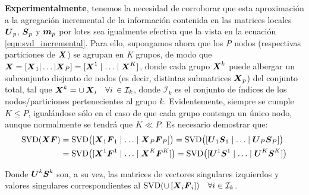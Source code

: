 \documentclass[00-Trabajo_Final.tex]{subfiles}
\begin{document}
\vspace{0.5em}

\textbf{Experimentalmente}, tenemos la necesidad de corroborar que esta aproximación a la agregación incremental de la información contenida en las matrices locales $\boldsymbol{U}_p$, $\boldsymbol{S}_p$ y $\boldsymbol{m}_p$ por lotes sea igualmente efectiva que la vista en la ecuación \eqref{eqn:svd_incremental}. Para ello, supongamos ahora que los \textit{P} nodos (respectivas particiones de $\boldsymbol{X}$) se agrupan en \textit{K} grupos, de modo que $\boldsymbol{X} = [\boldsymbol{X}_1|\ldots|\boldsymbol{X}_P] = [\boldsymbol{X}^{1} \mid \ldots \mid \boldsymbol{X}^{K}]$, donde cada grupo $\boldsymbol{X}^k$ puede albergar un subconjunto disjunto de nodos (es decir, distintas submatrices $\boldsymbol{X}_p$) del conjunto total, tal que $\boldsymbol{X}^{k} = \cup\,\boldsymbol{X}_i\quad\forall{i}\,\in\mathcal{I}_k$, donde $\mathcal{I}_k$ es el conjunto de índices de los nodos/particiones pertenecientes al grupo $k$. Evidentemente, siempre se cumple $K \le P$, igualándose sólo en el caso de que cada grupo contenga un único nodo, aunque normalmente se tendrá que $K \ll P$. Es necesario demostrar que:
\begin{align}
\label{eqn:svd_parcial1}
\text{SVD}(\boldsymbol{XF}) &= \text{SVD}\bigl([\boldsymbol{X}_1\boldsymbol{F}_1 \mid \ldots \mid \boldsymbol{X}_P\boldsymbol{F}_P]\bigr) = \text{SVD}\bigl([\boldsymbol{U}_1 \boldsymbol{S}_1 \mid \ldots \mid \boldsymbol{U}_P \boldsymbol{S}_P]\bigr) \nonumber \\
&= \text{SVD}\bigl([\boldsymbol{X}^{1}\boldsymbol{F}^{1} \mid \ldots \mid \boldsymbol{X}^{K}\boldsymbol{F}^{K}]\bigr) = \text{SVD}\bigl([\boldsymbol{U}^1 \boldsymbol{S}^1 \mid \ldots \mid \boldsymbol{U}^K \boldsymbol{S}^K]\bigr)
\end{align}

\noindent Donde $\boldsymbol{U}^k\boldsymbol{S}^k$ son, a su vez, las matrices de vectores singulares izquierdos y valores singulares correspondientes al $\text{SVD}(\cup\,[\boldsymbol{X}_{i}\boldsymbol{F}_i])\quad\forall{i}\in\mathcal{I}_k$.
\end{document}
